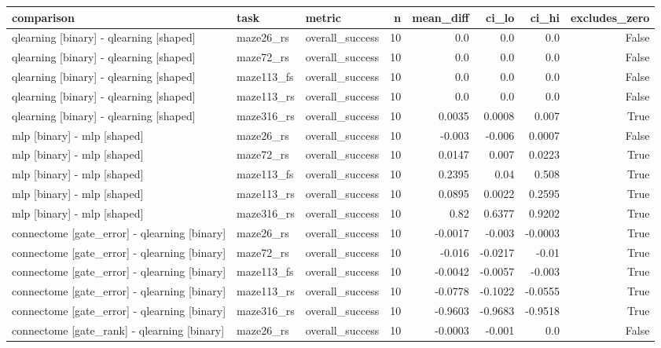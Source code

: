 \begin{table}[t]
\centering
\small
\begin{tabular}{lllrrrrr}
\toprule
comparison & task & metric & n & mean\_diff & ci\_lo & ci\_hi & excludes\_zero \\
\midrule
qlearning [binary] - qlearning [shaped] & maze26\_rs & overall\_success & 10 & 0.0 & 0.0 & 0.0 & False \\
qlearning [binary] - qlearning [shaped] & maze72\_rs & overall\_success & 10 & 0.0 & 0.0 & 0.0 & False \\
qlearning [binary] - qlearning [shaped] & maze113\_fs & overall\_success & 10 & 0.0 & 0.0 & 0.0 & False \\
qlearning [binary] - qlearning [shaped] & maze113\_rs & overall\_success & 10 & 0.0 & 0.0 & 0.0 & False \\
qlearning [binary] - qlearning [shaped] & maze316\_rs & overall\_success & 10 & 0.0035 & 0.0008 & 0.007 & True \\
mlp [binary] - mlp [shaped] & maze26\_rs & overall\_success & 10 & -0.003 & -0.006 & 0.0007 & False \\
mlp [binary] - mlp [shaped] & maze72\_rs & overall\_success & 10 & 0.0147 & 0.007 & 0.0223 & True \\
mlp [binary] - mlp [shaped] & maze113\_fs & overall\_success & 10 & 0.2395 & 0.04 & 0.508 & True \\
mlp [binary] - mlp [shaped] & maze113\_rs & overall\_success & 10 & 0.0895 & 0.0022 & 0.2595 & True \\
mlp [binary] - mlp [shaped] & maze316\_rs & overall\_success & 10 & 0.82 & 0.6377 & 0.9202 & True \\
connectome [gate\_error] - qlearning [binary] & maze26\_rs & overall\_success & 10 & -0.0017 & -0.003 & -0.0003 & True \\
connectome [gate\_error] - qlearning [binary] & maze72\_rs & overall\_success & 10 & -0.016 & -0.0217 & -0.01 & True \\
connectome [gate\_error] - qlearning [binary] & maze113\_fs & overall\_success & 10 & -0.0042 & -0.0057 & -0.003 & True \\
connectome [gate\_error] - qlearning [binary] & maze113\_rs & overall\_success & 10 & -0.0778 & -0.1022 & -0.0555 & True \\
connectome [gate\_error] - qlearning [binary] & maze316\_rs & overall\_success & 10 & -0.9603 & -0.9683 & -0.9518 & True \\
connectome [gate\_rank] - qlearning [binary] & maze26\_rs & overall\_success & 10 & -0.0003 & -0.001 & 0.0 & False \\

\end{tabular}
\end{table}
